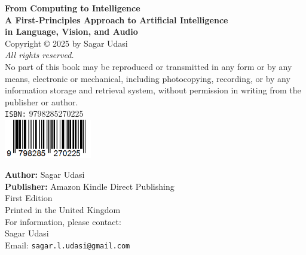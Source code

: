\thispagestyle{empty}

\vspace*{1in}
\begin{center}
    \huge {\textbf{From Computing to Intelligence}} \\[0.5em]
    
    \large \textbf{A First-Principles Approach to Artificial Intelligence \\in Language, Vision, and Audio}\\[1.5em]
    
    \normalsize
    Copyright © 2025 by Sagar Udasi\\[2em]
    
    \textit{All rights reserved.} \\
    No part of this book may be reproduced or transmitted in any form or by any means, electronic or mechanical, including photocopying, recording, or by any information storage and retrieval system, without permission in writing from the publisher or author.\\[2em]
    
    \texttt{ISBN:} 9798285270225 \\[2em]

    \includegraphics[width=1.5in]{parts/graphics/barcode.png}

    \textbf{Author:} Sagar Udasi \\
    \textbf{Publisher:} Amazon Kindle Direct Publishing \\
    First Edition\\[1em]

    Printed in the United Kingdom\\[2em]
    
    For information, please contact:\\
    Sagar Udasi\\
    Email: \texttt{sagar.l.udasi@gmail.com}
\end{center}
